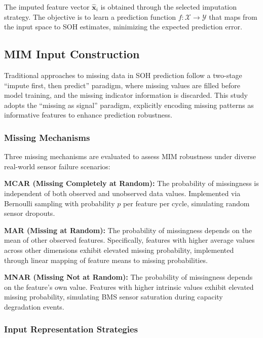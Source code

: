\documentclass[5p,times]{elsarticle}
\begin{document}
The imputed feature vector $\hat{\mathbf{x}}_i$ is obtained through the selected imputation strategy. The objective is to learn a prediction function $f: \mathcal{X} \rightarrow \mathcal{Y}$ that maps from the input space to SOH estimates, minimizing the expected prediction error.

\subsection{MIM Input Construction}\label{sec:mim}

Traditional approaches to missing data in SOH prediction follow a two-stage ``impute first, then predict'' paradigm, where missing values are filled before model training, and the missing indicator information is discarded. This study adopts the ``missing as signal'' paradigm, explicitly encoding missing patterns as informative features to enhance prediction robustness.

\subsubsection{Missing Mechanisms}

Three missing mechanisms are evaluated to assess MIM robustness under diverse real-world sensor failure scenarios:

\textbf{MCAR (Missing Completely at Random):} The probability of missingness is independent of both observed and unobserved data values. Implemented via Bernoulli sampling with probability $p$ per feature per cycle, simulating random sensor dropouts.

\textbf{MAR (Missing at Random):} The probability of missingness depends on the mean of other observed features. Specifically, features with higher average values across other dimensions exhibit elevated missing probability, implemented through linear mapping of feature means to missing probabilities.

\textbf{MNAR (Missing Not at Random):} The probability of missingness depends on the feature's own value. Features with higher intrinsic values exhibit elevated missing probability, simulating BMS sensor saturation during capacity degradation events.

\subsubsection{Input Representation Strategies}
\end{document}
